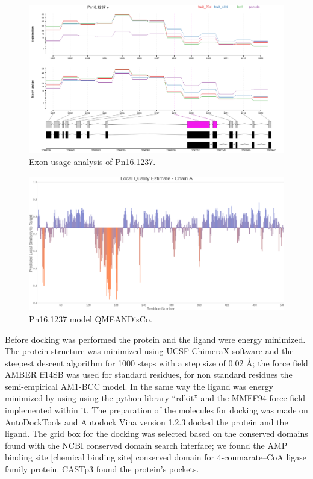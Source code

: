 \documentclass[12pt]{article}
\begin{document}
	\FloatBarrier
	\begin{figure}
		\centering
		\includegraphics[width=\textwidth-50pt]{../6/known/Transcripts/7.png}
		\caption{\centering Exon usage analysis of Pn16.1237.}
		\label{fig6k_1}
	\end{figure}
	\FloatBarrier
	
	\FloatBarrier
	\begin{figure}
		\centering
		\includegraphics[width=\textwidth-50pt]{../6/known/Swiss/Local_quality_estimate.png}
		\caption{\centering Pn16.1237 model QMEANDisCo.}
		\label{fig6k_3}
	\end{figure}
	\FloatBarrier
	
	\newpage
	
	Before docking was performed the protein and the ligand were energy minimized. The protein structure was minimized using UCSF ChimeraX software \cite{chimera,chimera_2} and the steepest descent algorithm for 1000 steps with a step size of 0.02 \r{A}; the force field AMBER ff14SB was used for standard residues, for non standard residues the semi-empirical AM1-BCC model. \cite{am1_bcc,am1_bcc_2,am1_bcc_3} In the same way the ligand was energy minimized by using using the python library ``rdkit'' and the MMFF94 force field implemented within it. \cite{rdkit,rdkit_mmff}	The preparation of the molecules for docking was made on AutoDockTools and Autodock Vina version 1.2.3 docked the protein and the ligand. \cite{adt,vina,vina_2} The grid box for the docking was selected based on the conserved domains found with the NCBI conserved domain search interface; we found the AMP binding site [chemical binding site] conserved domain for 4-coumarate--CoA ligase family protein. \cite{cdd,cdd_2}  CASTp3 found the protein's pockets.
	
\end{document}
